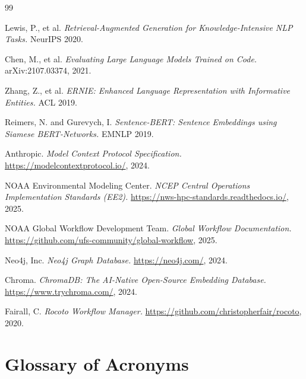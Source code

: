 \documentclass[11pt,letterpaper]{article}
\begin{document}
\begin{thebibliography}{99}

Lewis, P., et al.
\textit{Retrieval-Augmented Generation for Knowledge-Intensive NLP Tasks.}
NeurIPS 2020.

Chen, M., et al.
\textit{Evaluating Large Language Models Trained on Code.}
arXiv:2107.03374, 2021.

Zhang, Z., et al.
\textit{ERNIE: Enhanced Language Representation with Informative Entities.}
ACL 2019.

Reimers, N. and Gurevych, I.
\textit{Sentence-BERT: Sentence Embeddings using Siamese BERT-Networks.}
EMNLP 2019.

Anthropic.
\textit{Model Context Protocol Specification.}
\url{https://modelcontextprotocol.io/}, 2024.

NOAA Environmental Modeling Center.
\textit{NCEP Central Operations Implementation Standards (EE2).}
\url{https://nws-hpc-standards.readthedocs.io/}, 2025.

NOAA Global Workflow Development Team.
\textit{Global Workflow Documentation.}
\url{https://github.com/ufs-community/global-workflow}, 2025.

Neo4j, Inc.
\textit{Neo4j Graph Database.}
\url{https://neo4j.com/}, 2024.

Chroma.
\textit{ChromaDB: The AI-Native Open-Source Embedding Database.}
\url{https://www.trychroma.com/}, 2024.

Fairall, C.
\textit{Rocoto Workflow Manager.}
\url{https://github.com/christopherfair/rocoto}, 2020.

\end{thebibliography}

\appendix
\section{Glossary of Acronyms}
\end{document}
